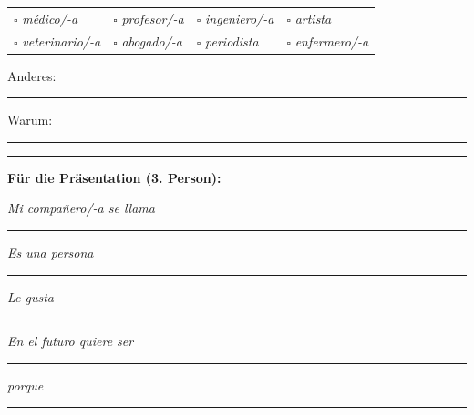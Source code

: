 \documentclass[11pt, a4paper]{article}
\begin{document}
\begin{tcolorbox}[colback=gruppeB!10, colframe=gruppeB, boxrule=0.5pt, title={\small\bfseries 3. ¿Qué profesión quieres tener? ¿Por qué?}]
\begin{tabular}{@{}p{3.5cm}p{3.5cm}p{3.5cm}p{3.5cm}@{}}
$\square$ \textit{médico/-a} & $\square$ \textit{profesor/-a} & $\square$ \textit{ingeniero/-a} & $\square$ \textit{artista} \\
$\square$ \textit{veterinario/-a} & $\square$ \textit{abogado/-a} & $\square$ \textit{periodista} & $\square$ \textit{enfermero/-a} \\
\end{tabular}
\vspace{0.1cm}

Anderes: \rule{4cm}{0.4pt} \quad Warum: \rule{4cm}{0.4pt}
\end{tcolorbox}

\vspace{0.3cm}

\hrule
\vspace{0.3cm}

{\small\bfseries Für die Präsentation (3. Person):}

\vspace{0.2cm}

\textit{Mi compañero/-a se llama} \rule{4cm}{0.4pt}

\textit{Es una persona} \rule{5cm}{0.4pt}

\textit{Le gusta} \rule{5cm}{0.4pt}

\textit{En el futuro quiere ser} \rule{4cm}{0.4pt} \textit{porque} \rule{3cm}{0.4pt}
\end{document}
